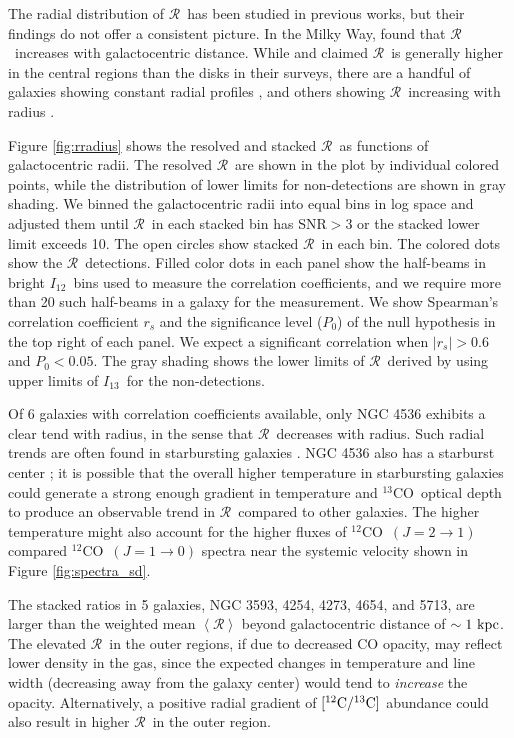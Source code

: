 \documentclass{emulateapj}
\def\ttco{\mbox{$^{13}$CO}}
\def\twco{\mbox{$^{12}$CO}}
\def\rtt{$\mathcal{R}$}
\def\itw{$I_{12}$}
\def\itt{$I_{13}$}
\begin{document}
The radial distribution of \rtt \ has been studied in 
previous works, but their findings do not offer a consistent  picture. 
In the Milky Way, \citet{Roman-Duval2016} found that \rtt \  increases with galactocentric distance.
While \citet{R&B1985} and \citet{Paglione2001} claimed \rtt \ is 
generally higher in the central regions than the disks 
in their surveys, there are a handful of galaxies 
showing constant radial profiles \citep{Y&S1986, S&I1991}, 
and others showing \rtt \ increasing with radius \citep[e.g. M51,][]{Pety2013}.


Figure \ref{fig:rradius} shows the resolved and stacked \rtt \ 
as functions of galactocentric radii. 
The resolved \rtt \  are shown in the plot by individual colored points, 
while the distribution of lower limits for non-detections are shown in gray shading.
We binned the galactocentric radii into equal bins in log space and adjusted them 
until \rtt \ in each stacked bin has SNR$>3$ or the stacked lower limit exceeds 10. 
The open circles show stacked \rtt \ in each bin. 
The colored dots show the \rtt \ detections.  
Filled color dots in each panel show the half-beams in bright \itw \ bins used to measure the correlation coefficients, 
and we require more than 20 such half-beams in a galaxy for the measurement. 
We show Spearman's correlation coefficient $r_s$ and 
the significance level ($P_{0}$) of the null hypothesis 
in the top right of each panel.  
We expect a significant correlation when $|r_s| > 0.6$ and $P_{0} < 0.05$.
The gray shading shows the lower limits of \rtt \ derived by using upper limits of \itt \ for the non-detections.


Of 6 galaxies with correlation coefficients available, 
only NGC 4536 exhibits a clear tend with radius, in the sense that 
 \rtt \ decreases with radius. 
Such radial trends are often found in starbursting galaxies
\citep[e.g.][]{Aalto2010, Tosaki2002, Hirota2010}. 
NGC 4536 also has a starburst center \citep[e.g.][]{Davies1997}; 
it is possible that the overall higher temperature 
in starbursting galaxies could 
generate a strong enough gradient in temperature and \ttco \  optical
depth to produce an observable trend in \rtt \  compared to other galaxies.
The higher temperature might also account for the 
higher fluxes of \twco \ $(J = 2 \rightarrow 1)$ compared \twco \ $(J = 1 \rightarrow 0)$
spectra near the systemic velocity shown in Figure \ref{fig:spectra_sd}.

The stacked ratios in 5 galaxies, NGC 3593, 4254, 4273, 4654, and 5713, 
are larger than the weighted mean $\left< \mathcal{R}\right>$
beyond galactocentric distance of $\sim 1 \  \rm kpc$. 
The elevated \rtt \ in the outer regions, if due to decreased CO opacity, may reflect lower density in the gas, since the expected changes in temperature and line width (decreasing away from the galaxy center) would tend to {\it increase} the opacity. 
Alternatively, a positive radial gradient of $[\rm ^{12}C/^{13}C]$ 
abundance  could also result in higher \rtt \ in the outer region. 
\end{document}
